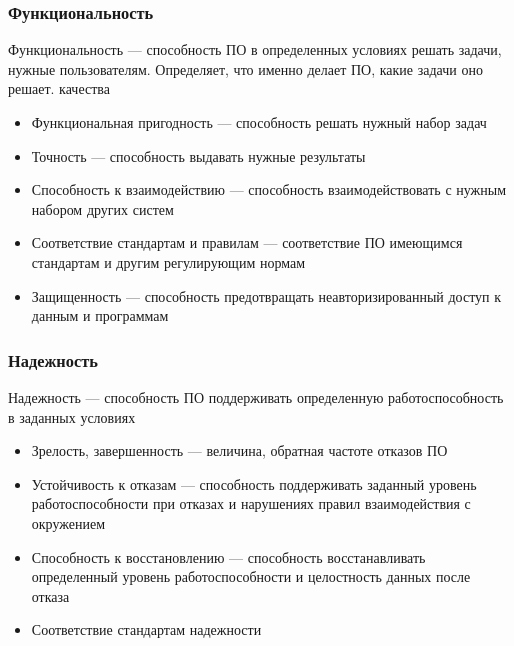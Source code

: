 \documentclass{../industrial-development}
\begin{document}
\begin{frame} \frametitle {Функциональность}
  \begin{block}{}
	\alert{Функциональность} --- способность ПО в определенных условиях решать задачи, нужные пользователям. Определяет, что именно делает ПО, какие задачи оно решает. качества 
  \end{block}
 	 \begin{itemize}
\item Функциональная пригодность --- способность решать нужный набор задач
  	\end{itemize}
   	 \begin{itemize}
  	\item Точность --- способность выдавать нужные результаты
  \end{itemize}
\begin{itemize}
	\item Способность к взаимодействию --- способность взаимодействовать с нужным набором других систем
\end{itemize}
\begin{itemize}
	\item Соответствие стандартам и правилам --- соответствие ПО имеющимся стандартам и другим регулирующим нормам
\end{itemize}
\begin{itemize}
	\item Защищенность --- способность предотвращать неавторизированный доступ к данным и программам
\end{itemize}
\end{frame}

\begin{frame} \frametitle {Надежность}
	\begin{block}{}
		\alert{Надежность} ---  способность  ПО  поддерживать  определенную  работоспособность в заданных условиях 
	\end{block}
	\begin{itemize}
		\item Зрелость, завершенность --- величина, обратная частоте отказов ПО
	\end{itemize}
	\begin{itemize}
		\item Устойчивость к отказам --- способность поддерживать заданный уровень работоспособности при отказах и нарушениях правил взаимодействия с окружением
	\end{itemize}
	\begin{itemize}
		\item Способность к восстановлению --- способность восстанавливать определенный уровень работоспособности и целостность данных после отказа
	\end{itemize}
	\begin{itemize}
		\item Соответствие стандартам надежности
	\end{itemize}
\end{frame}
\end{document}
